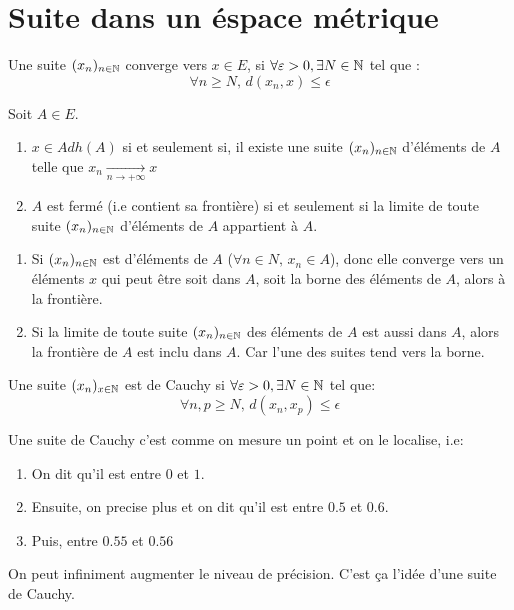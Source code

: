 \section{Suite dans un éspace métrique}
\begin{definition}
    Une suite $(x_n)_{n \in \mathbb{N}}$ converge vers $x \in E$, si  $\forall \varepsilon > 0, \exists N \in \mathbb{N}$ tel que :
    \[
    \forall n \ge N, \, d(x_n, x) \le  \epsilon
    \] 
\end{definition}
\begin{prop}
   Soit $A \in E$.\\ 
   \begin{enumerate}
       \item $x \in Adh(A)$ si et seulement si, il existe une suite $(x_n)_{n \in \mathbb{N}}$ d'éléments de $A$ telle que  $x_n \xrightarrow[n \to +\infty]{} x$ 
       \item $A$ est fermé (i.e contient sa frontière) si et seulement si la limite de toute suite  $(x_n)_{n \in \mathbb{N}}$ d'éléments de $A$ appartient à  $A$.
   \end{enumerate}
\end{prop}
\begin{intuition}
   \begin{enumerate}
       \item Si $(x_n)_{n \in \mathbb{N}}$ est d'éléments de  $A$ ($\forall n \in N, \, x_n \in A$), donc elle converge vers un éléments $x$ qui peut être soit dans  $A$, soit la borne des éléments de  $A$, alors à la frontière. 
       \item Si la limite de toute suite $(x_n)_{n \in \mathbb{N}}$ des éléments de  $A$ est aussi dans  $A$, alors la frontière de  $A$ est inclu dans  $A$. Car l'une des suites tend vers la borne.
   \end{enumerate} 
\end{intuition}
\begin{definition}
    Une suite $(x_n)_{x \in \mathbb{N}}$ est de Cauchy si  $\forall \varepsilon > 0, \exists N \in \mathbb{N}$ tel que:
    \[
    \forall n, p \ge N, \, d(x_n, x_p) \le \epsilon
    \] 
\end{definition}
\begin{intuition}
   Une suite de Cauchy c'est comme on mesure un point et on le localise, i.e:
   \begin{enumerate}
       \item On dit qu'il est entre $0$ et  $1$.
       \item Ensuite, on precise plus et on dit qu'il est entre  $0.5$ et  $0.6$.
       \item Puis, entre  $0.55$ et  $0.56$
   \end{enumerate}
   On peut infiniment augmenter le niveau de précision. C'est ça l'idée d'une suite de Cauchy.
\end{intuition}
